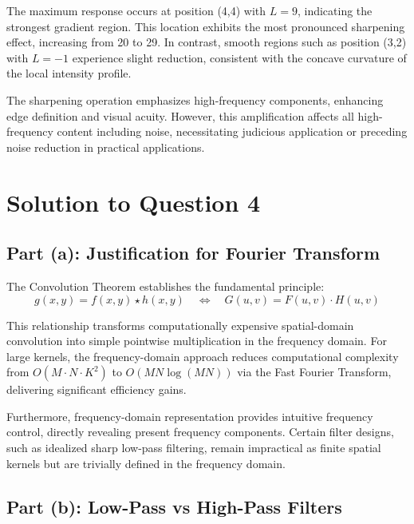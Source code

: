 \documentclass[12pt,a4paper]{article}
\begin{document}
The maximum response occurs at position (4,4) with $L = 9$, indicating the strongest gradient region. This location exhibits the most pronounced sharpening effect, increasing from 20 to 29. In contrast, smooth regions such as position (3,2) with $L = -1$ experience slight reduction, consistent with the concave curvature of the local intensity profile.

The sharpening operation emphasizes high-frequency components, enhancing edge definition and visual acuity. However, this amplification affects all high-frequency content including noise, necessitating judicious application or preceding noise reduction in practical applications.

\vspace{1.0cm}
\section*{Solution to Question 4}

\subsection*{Part (a): Justification for Fourier Transform}

The Convolution Theorem establishes the fundamental principle:
\begin{equation*}
g(x,y) = f(x,y) \star h(x,y) \quad \Leftrightarrow \quad G(u,v) = F(u,v) \cdot H(u,v)
\end{equation*}

This relationship transforms computationally expensive spatial-domain convolution into simple pointwise multiplication in the frequency domain. For large kernels, the frequency-domain approach reduces computational complexity from $O(M \cdot N \cdot K^2)$ to $O(MN \log(MN))$ via the Fast Fourier Transform, delivering significant efficiency gains.

Furthermore, frequency-domain representation provides intuitive frequency control, directly revealing present frequency components. Certain filter designs, such as idealized sharp low-pass filtering, remain impractical as finite spatial kernels but are trivially defined in the frequency domain.

\subsection*{Part (b): Low-Pass vs High-Pass Filters}
\end{document}
